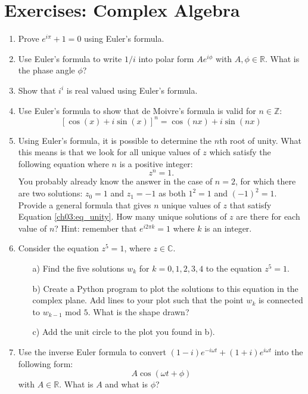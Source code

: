 \newpage
\section{Exercises: Complex Algebra}

\begin{enumerate}
\item Prove $e^{i\pi}+1=0$ using Euler's formula. 
\item Use Euler's formula to write $1/i$ into polar form $Ae^{i\phi}$ with $A,\phi\in\mathbb{R}$. What is the phase angle $\phi$?
\item Show that $i^{i}$ is real valued using Euler's formula. 
\item Use Euler's formula to show that de Moivre's formula is valid for $n\in\mathbb{Z}$:
$$[\cos(x)+i\sin(x)]^{n}=\cos(nx)+i\sin(nx)$$

\item Using Euler's formula, it is possible to determine the $n$th root of unity. What this means is that we look for all unique values of $z$ which satisfy the following equation where $n$ is a positive integer:
\begin{equation}
    z^{n}=1.
    \label{ch03:eq_unity}
\end{equation}
You probably already know the answer in the case of $n=2$, for which there are two solutions: $z_{0}=1$ and $z_{1}=-1$ as both $1^{2}=1$ and $(-1)^{2}=1$. \\
Provide a general formula that gives $n$ unique values of $z$ that
satisfy Equation \ref{ch03:eq_unity}. How many unique solutions of $z$ are there
for each value of $n$? Hint: remember that $e^{i 2\pi k} = 1$ where
$k$ is an integer. 
\item Consider the equation $z^{5}=1$, where $z\in\mathbb{C}$. 
\begin{itemize}
    \item[a)] Find the five solutions $w_{k}$ for $k=0,1,2,3,4$ to the equation $z^{5}=1$. 
    \item[b)] Create a Python program to plot the solutions to this equation in the complex plane. Add lines to your plot such that the point $w_{k}$ is connected to $w_{k-1}$ mod $5$. What is the shape drawn?
    \item[c)] Add the unit circle to the plot you found in b). 
\end{itemize}

\item Use the inverse Euler formula to convert $(1-i) e^{-i \omega t} + (1+i) e^{i
  \omega t}$ into the following form:
\begin{equation*}
    A \cos(\omega t  + \phi)
\end{equation*}
with $A\in \mathbb{R}$. What is $A$ and what is $\phi$?


\end{enumerate}
